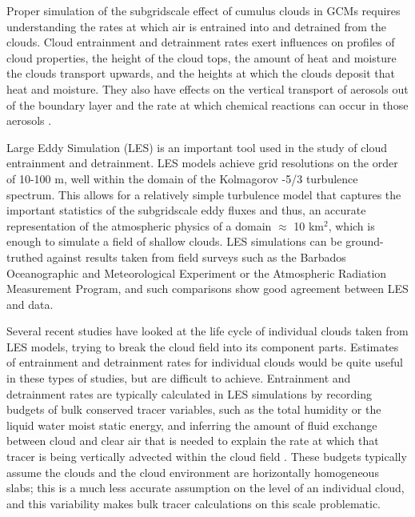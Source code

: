 \documentclass[12pt]{article}
\begin{document}
Proper simulation of the subgridscale effect of cumulus clouds in GCMs requires 
understanding the rates at which air is entrained into and detrained from the 
clouds. Cloud entrainment and detrainment rates exert influences on profiles of 
cloud properties, the height of the cloud tops, the amount of heat and moisture 
the clouds transport upwards, and the heights at which the clouds deposit that 
heat and moisture.  They also have effects on the vertical transport of 
aerosols out of the boundary layer and the rate at which chemical reactions can 
occur in those aerosols \citep{Barahona2007,Anldrejczuk2008}.

Large Eddy Simulation (LES) is an important tool used in the study of cloud 
entrainment and detrainment. LES models achieve grid resolutions on the order 
of 10-100 m, well within the domain of the Kolmagorov -5/3 turbulence spectrum. 
This allows for a relatively simple turbulence model that captures the 
important statistics of the subgridscale eddy fluxes and thus, an accurate 
representation of the atmospheric physics of a domain $\approx$ 10 km$^{2}$, 
which is enough to simulate a field of shallow clouds. LES simulations can be 
ground-truthed against results taken from field surveys such as the Barbados 
Oceanographic and Meteorological Experiment \citep[BOMEX;][]{Holland1973} or 
the Atmospheric Radiation Measurement \citep[ARM;][]{Brown2002} Program, and 
such comparisons show good agreement between LES and data.

Several recent studies have looked at the life cycle of individual clouds taken 
from LES models, trying to break the cloud field into its component parts. 
Estimates of entrainment and detrainment rates for individual clouds would be 
quite useful in these types of studies, but are difficult to achieve. 
Entrainment and detrainment rates are typically calculated in LES simulations 
by recording budgets of bulk conserved tracer variables, such as the total 
humidity or the liquid water moist static energy, and inferring the amount of
fluid exchange between cloud and clear air that is needed to explain the rate 
at which that tracer is being vertically advected within the cloud field 
\citep{Siebesma1995}. These budgets typically assume the clouds and the cloud 
environment are horizontally homogeneous slabs; this is a much less accurate 
assumption on the level of an individual cloud, and this variability makes 
bulk tracer calculations on this scale problematic.
\end{document}

